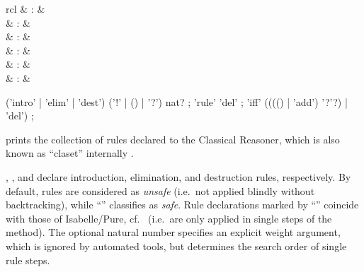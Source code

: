 \begin{isabellebody}
\begin{isamarkuptext}
\begin{descr}
  \end{descr}%
\end{isamarkuptext}%
\isamarkuptrue%
%
\isamarkuptrue%
%
\begin{isamarkuptext}%
\begin{matharray}{rcl}
    \hypertarget{command.print-claset}{\hyperlink{command.print-claset}{\mbox{}}}\isa{{\isachardoublequote}\isactrlsup {\isacharasterisk}{\isachardoublequote}} & : &  \\
    \hypertarget{attribute.intro}{\hyperlink{attribute.intro}{\mbox{}}} & : & \isaratt \\
    \hypertarget{attribute.elim}{\hyperlink{attribute.elim}{\mbox{}}} & : & \isaratt \\
    \hypertarget{attribute.dest}{\hyperlink{attribute.dest}{\mbox{}}} & : & \isaratt \\
    \hypertarget{attribute.rule}{\hyperlink{attribute.rule}{\mbox{}}} & : & \isaratt \\
    \hypertarget{attribute.iff}{\hyperlink{attribute.iff}{\mbox{}}} & : & \isaratt \\
  \end{matharray}

  \begin{rail}
    ('intro' | 'elim' | 'dest') ('!' | () | '?') nat?
    ;
    'rule' 'del'
    ;
    'iff' (((() | 'add') '?'?) | 'del')
    ;
  \end{rail}

  \begin{descr}

  \item [\hyperlink{command.print-claset}{\mbox{\isa{\isacommand{print{\isacharunderscore}claset}}}}] prints the collection of rules
  declared to the Classical Reasoner, which is also known as
  ``claset'' internally \cite{isabelle-ref}.
  
  \item [\hyperlink{attribute.intro}{\mbox{\isa{intro}}}, \hyperlink{attribute.elim}{\mbox{\isa{elim}}}, and \hyperlink{attribute.dest}{\mbox{\isa{dest}}}]
  declare introduction, elimination, and destruction rules,
  respectively.  By default, rules are considered as \emph{unsafe}
  (i.e.\ not applied blindly without backtracking), while ``\isa{{\isachardoublequote}{\isacharbang}{\isachardoublequote}}'' classifies as \emph{safe}.  Rule declarations marked by
  ``\isa{{\isachardoublequote}{\isacharquery}{\isachardoublequote}}'' coincide with those of Isabelle/Pure, cf.\
   (i.e.\ are only applied in single steps
  of the \hyperlink{method.rule}{\mbox{\isa{rule}}} method).  The optional natural number
  specifies an explicit weight argument, which is ignored by automated
  tools, but determines the search order of single rule steps.


\end{descr}
\end{isamarkuptext}
\end{isabellebody}
